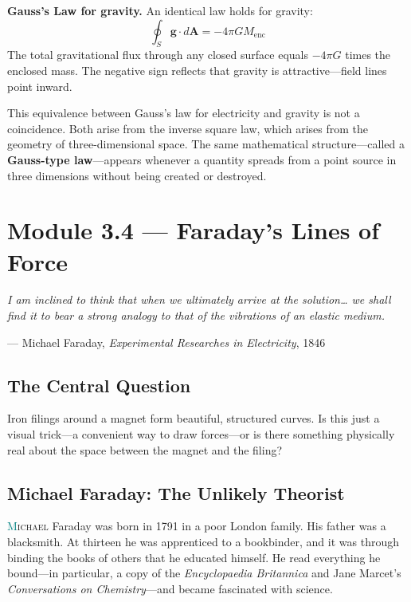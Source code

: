 \documentclass[12pt, a4paper, twoside]{book}
\theoremstyle{disc}
\begin{document}
\begin{namebox}
\textbf{Gauss's Law for gravity.} An identical law holds for gravity:
\begin{equation}
  \oint_S \bm{g} \cdot d\bm{A} = -4\pi G M_{\text{enc}}
\end{equation}
The total gravitational flux through any closed surface equals $-4\pi G$ times the enclosed mass. The negative sign reflects that gravity is attractive---field lines point inward.

This equivalence between Gauss's law for electricity and gravity is not a coincidence. Both arise from the inverse square law, which arises from the geometry of three-dimensional space. The same mathematical structure---called a \textbf{Gauss-type law}---appears whenever a quantity spreads from a point source in three dimensions without being created or destroyed.
\end{namebox}

\section{Module 3.4 — Faraday's Lines of Force}
\label{sec:faraday_lines}

\epigraph{\itshape
  I am inclined to think that when we ultimately arrive at the
  solution\ldots{} we shall find it to bear a strong analogy
  to that of the vibrations of an elastic medium.
}{--- Michael Faraday, \textit{Experimental Researches in Electricity}, 1846}

\subsection{The Central Question}

\begin{puzzlebox}
Iron filings around a magnet form beautiful, structured curves. Is this just a visual trick---a convenient way to draw forces---or is there something physically real about the space between the magnet and the filing?
\end{puzzlebox}

\subsection{Michael Faraday: The Unlikely Theorist}

\lettrine[lines=3,loversize=0.08]{\textcolor{teal}{M}}{ichael} Faraday was born in 1791 in a poor London family. His father was a blacksmith. At thirteen he was apprenticed to a bookbinder, and it was through binding the books of others that he educated himself. He read everything he bound---in particular, a copy of the \textit{Encyclopaedia Britannica} and Jane Marcet's \textit{Conversations on Chemistry}---and became fascinated with science.
\end{document}

